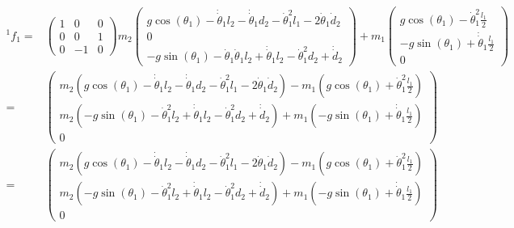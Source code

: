 \documentclass[10pt,a4paper]{article}
\begin{document}
\begin{align*}
  {}^{1}f_{1} = & \begin{pmatrix}
    1 & 0 & 0\\
    0 & 0 & 1\\
    0 & -1 & 0
  \end{pmatrix} m_{2}\begin{pmatrix}
    g\cos(\theta_{1}) - \dot{\dot{\theta}}_{1}l_{2} - \dot{\dot{\theta}}_{1}d_{2} - \dot{\theta}_{1}^{2}l_{1} - 2\dot{\theta}_{1}\dot{d}_{2}\\
    0\\
    -g\sin(\theta_{1}) - \dot{\theta}_{1}\dot{\theta}_{1}l_{2} + \dot{\dot{\theta}}_{1}l_{2} - \dot{\theta}_{1}^{2}d_{2} + \dot{\dot{d}}_{2}
  \end{pmatrix} + m_{1} \begin{pmatrix}
    g\cos(\theta_{1}) - \dot{\theta}_{1}^{2} \frac{l_{1}}{2}\\
    -g\sin(\theta_{1}) + \dot{\dot{\theta}}_{1} \frac{l_{1}}{2}\\
    0
  \end{pmatrix}\\
  = & \begin{pmatrix}
    m_{2}\left( g\cos(\theta_{1}) - \dot{\dot{\theta}}_{1}l_{2} - \dot{\dot{\theta}}_{1}d_{2} - \dot{\theta}_{1}^{2}l_{1} - 2\dot{\theta}_{1}\dot{d}_{2} \right) - m_{1} \left( g\cos(\theta_{1}) + \dot{\theta}_{1}^{2} \frac{l_{1}}{2} \right)\\
    m_{2}\left( -g\sin(\theta_{1}) - \dot{\theta}_{1}^{2}l_{2} + \dot{\dot{\theta}}_{1}l_{2} - \dot{\theta}_{1}^{2}d_{2} + \dot{\dot{d}}_{2} \right) + m_{1} \left( -g\sin(\theta_{1}) + \dot{\dot{\theta}}_{1} \frac{l_{1}}{2} \right)\\
    0
  \end{pmatrix}\\
  = & \begin{pmatrix}
    m_{2}\left( g\cos(\theta_{1}) - \dot{\dot{\theta}}_{1}l_{2} - \dot{\dot{\theta}}_{1}d_{2} - \dot{\theta}_{1}^{2}l_{1} - 2\dot{\theta}_{1}\dot{d}_{2} \right) - m_{1} \left( g\cos(\theta_{1}) + \dot{\theta}_{1}^{2} \frac{l_{1}}{2} \right)\\
    m_{2}\left( -g\sin(\theta_{1}) - \dot{\theta}_{1}^{2}l_{2} + \dot{\dot{\theta}}_{1}l_{2} - \dot{\theta}_{1}^{2}d_{2} + \dot{\dot{d}}_{2} \right) + m_{1} \left( -g\sin(\theta_{1}) + \dot{\dot{\theta}}_{1} \frac{l_{1}}{2} \right)\\
    0
  \end{pmatrix}
\end{align*}
\end{document}
